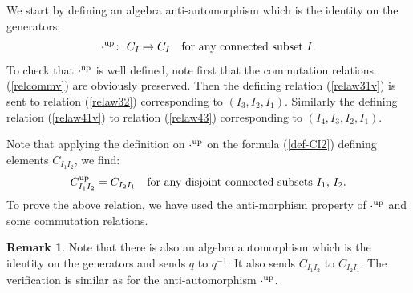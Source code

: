 \documentclass[pdftex]{sigma}
\numberwithin{equation}{section}
\theoremstyle{definition}
\newtheorem{rema}[theo]{Remark}
\begin{document}
We start by defining an algebra anti-automorphism which is the identity on the generators:
\begin{equation}\label{eq:up}
 {\cdot}^{\rm up}\colon \ C_I\mapsto C_I \quad \text{for any connected subset $I$} .
\end{equation}
To check that ${\cdot}^{\rm up}$ is well defined, note first that the commutation relations (\ref{relcommv}) are obviously preserved. Then the defining relation (\ref{relaw31v}) is sent to relation (\ref{relaw32}) corresponding to $(I_3,I_2,I_1)$. Similarly the defining relation (\ref{relaw41v}) to relation (\ref{relaw43}) corresponding to $(I_4,I_3,I_2,I_1)$.

Note that applying the definition on ${\cdot}^{\rm up}$ on the formula (\ref{def-CI2}) defining elements $C_{I_1I_2}$, we find:
\[C_{I_1I_2}^{\rm up}=C_{I_2I_1}\quad \text{for any disjoint connected subsets $I_1$, $I_2$.}\]
To prove the above relation, we have used the anti-morphism property of ${\cdot}^{\rm up}$ and some commutation relations.

\begin{rema}
Note that there is also an algebra automorphism which is the identity on the generators and sends $q$ to $q^{-1}$. It also sends $C_{I_1I_2}$ to $C_{I_2I_1}$. The verification is similar as for the anti-automorphism ${\cdot}^{\rm up}$.
\end{rema}
\end{document}
